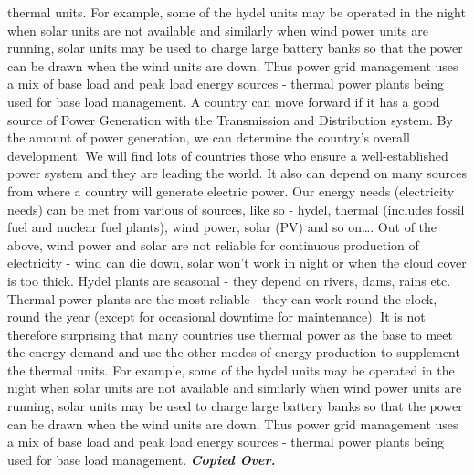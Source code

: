 \documentclass[10pt, a4paper]{article}
\begin{document}
thermal units. For example, some of the hydel units may be operated in the night when solar units are not available and similarly when wind power units are running, solar units may be used to charge large battery banks so that the power can be drawn when the wind units are down. Thus power grid management uses a mix of base load and peak load energy sources - thermal power plants being used for base load management. A country can move forward if it has a good source of Power Generation with the Transmission and Distribution system. By the amount of power generation, we can determine the country’s overall development. We will find lots of countries those who ensure a well-established power system and they are leading the world. It also can depend on many sources from where a country will generate electric power. Our energy needs (electricity needs) can be met from various of sources, like so - hydel, thermal (includes fossil fuel and nuclear fuel plants), wind power, solar (PV) and so on\dots. Out of the above, wind power and solar are not reliable for continuous production of electricity - wind can die down, solar won’t work in night or when the cloud cover is too thick. Hydel plants are seasonal - they depend on rivers, dams, rains etc. Thermal power plants are the most reliable - they can work round the clock, round the year (except for occasional downtime for maintenance). It is not therefore surprising that many countries use thermal power as the base to meet the energy demand and use the other modes of energy production to supplement the thermal units. For example, some of the hydel units may be operated in the night when solar units are not available and similarly when wind power units are running, solar units may be used to charge large battery banks so that the power can be drawn when the wind units are down. Thus power grid management uses a mix of base load and peak load energy sources - thermal power plants being used for base load management. \textit{\textbf{Copied Over.}}
\end{document}
